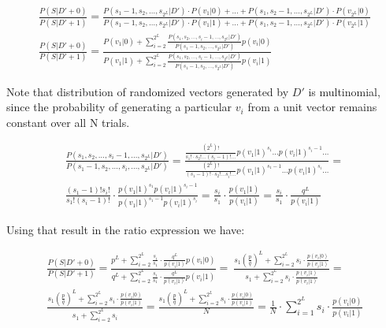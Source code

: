 \documentclass[11pt,draft]{article}
\begin{document}
\begin{align}
\frac{P(S|D'+0)}{P(S|D'+1)} = \frac{P(s_1-1,s_2,\dots,s_{2^L}|D') \cdot P(v_1|0) + \dots + P(s_1,s_2-1,\dots,s_{2^L}|D') \cdot P(v_{2^L}|0) }{P(s_1-1,s_2,\dots,s_{2^L}|D') \cdot P(v_1|1) + \dots + P(s_1,s_2-1,\dots,s_{2^L}|D') \cdot P(v_{2^L}|1)}\\
\frac{P(S|D'+0)}{P(S|D'+1)} = \frac{ P(v_1|0)  + \sum_{i=2}^{2^L} \frac{P(s_1,s_2,\dots,s_i-1,\dots,s_{2^L}|D')}{P(s_1-1,s_2,\dots,s_{2^L}|D')} p(v_i|0)} {P(v_1|1)  + \sum_{i=2}^{2^L} \frac{P(s_1,s_2,\dots,s_i-1,\dots,s_{2^L}|D')}{P(s_1-1,s_2,\dots,s_{2^L}|D')} p(v_i|1)}
\end{align}

Note that distribution of randomized vectors generated by $D'$ is multinomial, since the probability of generating a particular $v_i$ from a unit vector remains constant over all N trials.

\begin{align}
 \frac{P(s_1,s_2,\dots,s_i-1,\dots,s_{2^L}|D')}{P(s_1-1,s_2,\dots,s_i,\dots,s_{2^L}|D')}  = \frac{ \frac{(2^L)!}{s_1!\cdot s_2! \dots (s_i-1)!\dots} p(v_1|1)^{s_1} \dots p(v_i|1)^{s_i-1} \dots  }{ \frac{(2^L)!}{(s_1-1)!\cdot s_2! \dots s_i!\dots} p(v_1|1)^{s_1-1} \dots p(v_i|1)^{s_i} \dots} = \\
\frac{(s_1-1)!s_i!}{s_1!(s_i-1)!} \cdot \frac{p(v_1|1)^{s_1} p(v_i|1)^{s_i-1} }{  p(v_1|1)^{s_1-1} p(v_i|1)^{s_i} } = \frac{s_i}{s_1} \cdot \frac{p(v_1|1)}{p(v_i|1)} =  \frac{s_i}{s_1}  \cdot \frac{q^L}{p(v_i|1)}
 \end{align}
 
 
Using that result in the ratio expression we have:

\begin{align}
\frac{P(S|D'+0)}{P(S|D'+1)} = \frac{ p^L  + \sum_{i=2}^{2^L} \frac{s_i}{s_1}  \cdot \frac{q^L}{p(v_i|1)}  p(v_i|0) } {q^L  + \sum_{i=2}^{2^L} \frac{s_i}{s_1}  \cdot \frac{q^L}{p(v_i|1)} p(v_i|1)} = \
\frac{ s_1 \left ( \frac{p}{q} \right )^L  + \sum_{i=2}^{2^L} s_i  \cdot \frac{p(v_i|0)}{p(v_i|1)}   } {s_1 +   \sum_{i=2}^{2^L}  s_i \cdot  \frac{p(v_i|1)}{p(v_i|1)}   } = \\
\frac{ s_1 \left ( \frac{p}{q} \right )^L  + \sum_{i=2}^{2^L} s_i  \cdot \frac{p(v_i|0)}{p(v_i|1)}   } {s_1 +   \sum_{i=2}^{2^L}  s_i}    = \frac{ s_1 \left ( \frac{p}{q} \right )^L  + \sum_{i=2}^{2^L} s_i  \cdot \frac{p(v_i|0)}{p(v_i|1)}   } {N} = \frac{1}{N}  \cdot  \sum_{i=1}^{2^L} s_i  \cdot \frac{p(v_i|0)}{p(v_i|1)} 
\end{align}
\end{document}
